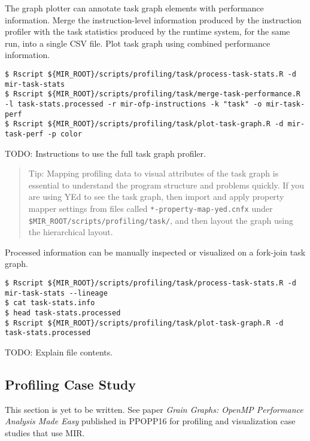 \documentclass[11pt,a4paper]{article}
\begin{document}
The graph plotter can annotate task graph elements with performance information. Merge the instruction-level information produced by the instruction profiler with the task statistics produced by the runtime system, for the same run, into a single CSV file. Plot task graph using combined performance information.

\begin{lstlisting}[style=MyInputStyle]
$ Rscript ${MIR_ROOT}/scripts/profiling/task/process-task-stats.R -d mir-task-stats
$ Rscript ${MIR_ROOT}/scripts/profiling/task/merge-task-performance.R -l task-stats.processed -r mir-ofp-instructions -k "task" -o mir-task-perf
$ Rscript ${MIR_ROOT}/scripts/profiling/task/plot-task-graph.R -d mir-task-perf -p color
\end{lstlisting}

TODO: Instructions to use the full task graph profiler.

\begin{framed}
\begin{quote}
Tip: Mapping profiling data to visual attributes of the task graph is essential to understand the program structure and problems quickly. If you are using YEd to see the task graph, then import and apply property mapper settings from files called \texttt{*-property-map-yed.cnfx} under \texttt{\$MIR\_ROOT/scripts/profiling/task/}, and then layout the graph using the hierarchical layout.
\end{quote}
\end{framed}

Processed information can be manually inspected or visualized on a fork-join task graph.

\begin{lstlisting}[style=MyInputStyle]
$ Rscript ${MIR_ROOT}/scripts/profiling/task/process-task-stats.R -d mir-task-stats --lineage
$ cat task-stats.info
$ head task-stats.processed
$ Rscript ${MIR_ROOT}/scripts/profiling/task/plot-task-graph.R -d task-stats.processed
\end{lstlisting}

TODO: Explain file contents.


\subsection{Profiling Case Study}

This section is yet to be written. See paper \textit{Grain Graphs: OpenMP Performance Analysis Made Easy} published in PPOPP16 for profiling and visualization case studies that use MIR.



\end{document}
